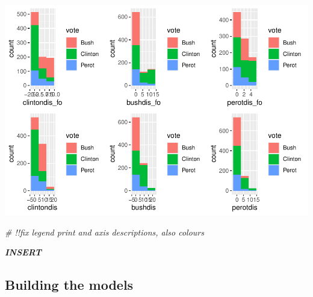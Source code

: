 \documentclass[
]{article}
\newenvironment{Shaded}{\begin{snugshade}}{\end{snugshade}}
\newcommand{\CommentTok}[1]{\textcolor[rgb]{0.56,0.35,0.01}{\textit{#1}}}
\begin{document}
\includegraphics{1992-US-election_files/figure-latex/unnamed-chunk-9-1.pdf}

\begin{Shaded}
\begin{Highlighting}[]
\CommentTok{\# !!fix legend print and axis descriptions, also colours}
\end{Highlighting}
\end{Shaded}

\textbf{\emph{INSERT}}

\hypertarget{building-the-models}{%
\subsection{Building the models}\label{building-the-models}}
\end{document}
